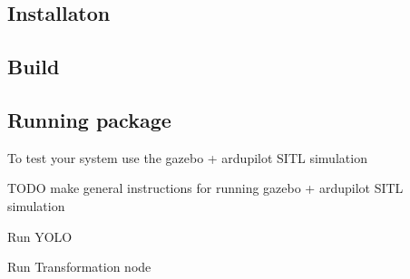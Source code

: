  \subsection*{Installaton}


\begin{DoxyCode}{0}
\end{DoxyCode}


\subsection*{Build}


\begin{DoxyCode}{0}
\end{DoxyCode}


\subsection*{Running package}

To test your system use the gazebo + ardupilot S\+I\+TL simulation

T\+O\+DO make general instructions for running gazebo + ardupilot S\+I\+TL simulation

Run Y\+O\+LO 
\begin{DoxyCode}{0}
\end{DoxyCode}


Run Transformation node 
\begin{DoxyCode}{0}
\end{DoxyCode}
 